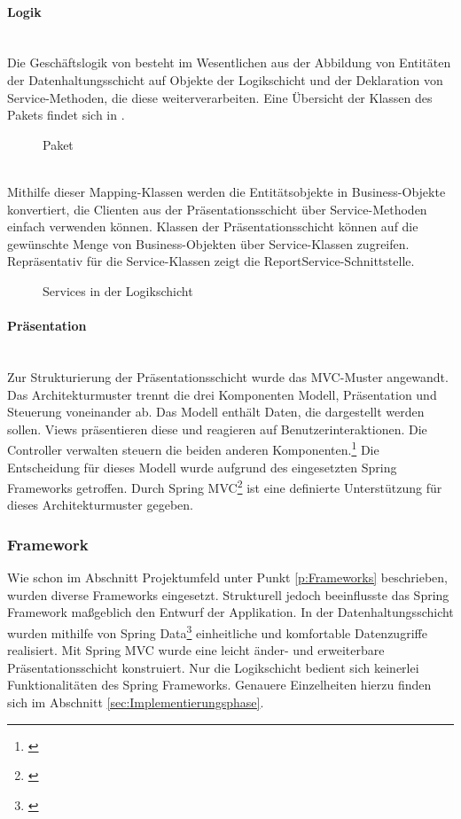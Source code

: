 \paragraph{Logik} ~\\
\label{p:Logik}
Die Geschäftslogik von \projektName besteht im Wesentlichen aus der Abbildung von Entitäten der Datenhaltungsschicht auf Objekte der Logikschicht und der Deklaration von Service-Methoden, die diese weiterverarbeiten. Eine Übersicht der Klassen des Pakets  findet sich in .
\begin{figure}[htb]
	\centering
	\caption{Paket }
	\label{fig:Mapping}
\end{figure}\\
Mithilfe dieser Mapping-Klassen werden die Entitätsobjekte in Business-Objekte konvertiert, die Clienten aus der Präsentationsschicht über Service-Methoden einfach verwenden können. Klassen der Präsentationsschicht können auf die gewünschte Menge von Business-Objekten über Service-Klassen zugreifen. Repräsentativ für die Service-Klassen zeigt  die ReportService-Schnittstelle.
\begin{figure}[htb]
	\centering
	\caption{Services in der Logikschicht}
	\label{fig:Logik}
\end{figure}

\paragraph{Präsentation} ~\\
\label{p:Praesentation}
Zur Strukturierung der Präsentationsschicht wurde das \ac{MVC}-Muster angewandt. Das Architekturmuster trennt die drei Komponenten Modell, Präsentation und Steuerung voneinander ab. Das Modell enthält Daten, die dargestellt werden sollen. Views präsentieren diese und reagieren auf Benutzerinteraktionen. Die Controller verwalten \bzw steuern die beiden anderen Komponenten.\footnote{\Vgl \cite{wiki:mvc}}
Die Entscheidung für dieses Modell wurde aufgrund des eingesetzten Spring Frameworks getroffen. Durch Spring MVC\footnote{\Vgl \cite{spring:mvc}} ist eine definierte Unterstützung für dieses Architekturmuster gegeben.

\subsubsection{Framework}
\label{sec:Framework}
Wie schon im Abschnitt Projektumfeld unter Punkt \ref{p:Frameworks} beschrieben, wurden diverse Frameworks eingesetzt. Strukturell jedoch beeinflusste das Spring Framework maßgeblich den Entwurf der Applikation. In der Datenhaltungsschicht wurden mithilfe von Spring Data\footnote{\Vgl \cite{spring:data}} einheitliche und komfortable Datenzugriffe realisiert. Mit Spring MVC wurde eine leicht änder- und erweiterbare Präsentationsschicht konstruiert. Nur die Logikschicht bedient sich keinerlei Funktionalitäten des Spring Frameworks. Genauere Einzelheiten hierzu finden sich im Abschnitt \ref{sec:Implementierungsphase}.

